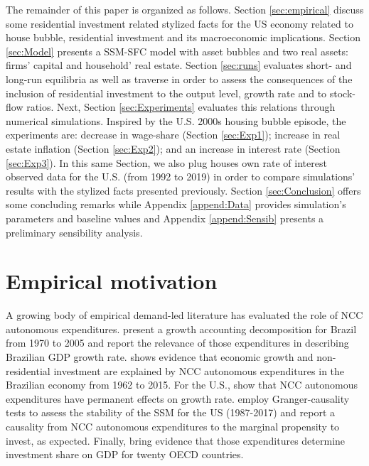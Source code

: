 \documentclass[12pt]{article}
\begin{document}
The remainder of this paper is organized as follows.
Section \ref{sec:empirical} discuss some residential investment related stylized facts for the US economy related to house bubble, residential investment and its macroeconomic implications.
Section \ref{sec:Model} presents a SSM-SFC model  with asset bubbles and two real assets: firms' capital and household' real estate. 
Section \ref{sec:runs} evaluates short- and long-run equilibria as well as traverse in order to assess the consequences  of the inclusion of residential investment to the output level, growth rate and to stock-flow ratios.
Next, Section \ref{sec:Experiments} evaluates this relations through numerical simulations.
Inspired by the U.S. 2000s housing bubble episode, the experiments are: decrease in wage-share (Section \ref{sec:Exp1}); increase in real estate inflation (Section \ref{sec:Exp2}); and an increase in interest rate (Section \ref{sec:Exp3}).
In this same Section, we also plug houses own rate of interest observed data for the U.S. (from 1992 to 2019) in order to compare simulations' results with the stylized facts presented previously.
Section \ref{sec:Conclusion} offers some concluding remarks while Appendix \ref{append:Data} provides simulation's parameters and baseline values and Appendix \ref{append:Sensib} presents a preliminary sensibility analysis.



\section{Empirical motivation}
\label{sec:orgaff5ee3}
\label{sec:empirical}
A growing body of empirical demand-led literature has evaluated the role of NCC autonomous expenditures.
\textcite{freitas_pattern_2013} present a growth accounting decomposition for Brazil from 1970 to 2005 and report the relevance of those expenditures in describing Brazilian GDP growth rate.
\textcite{braga_investment_2020} shows evidence that economic growth and non-residential investment are explained by NCC autonomous expenditures in the Brazilian economy from 1962 to 2015.
For the U.S., \textcite{girardi_long-run_2016} show that NCC autonomous expenditures have permanent effects on growth rate.
\textcite{haluska_growth_2020} employ Granger-causality tests to assess the stability of the SSM for the US (1987-2017) and report a causality from NCC autonomous expenditures to the marginal propensity to invest, as expected.
Finally, \textcite{girardi_autonomous_2020} bring evidence that those expenditures determine investment share on GDP for twenty OECD countries.
\end{document}
